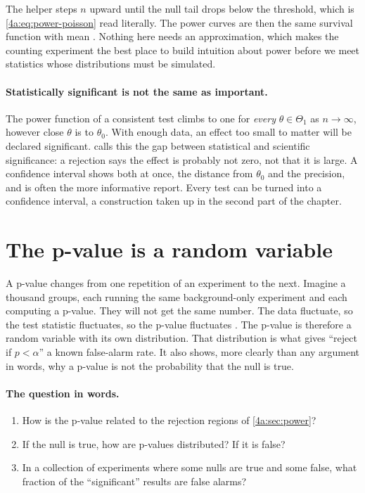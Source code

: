 
The helper  steps $n$ upward until the null tail
 drops below the threshold, which is
\eqref{4a:eq:power-poisson} read literally. The power curves are then the same
survival function with mean . Nothing here needs an
approximation, which makes the counting experiment the best place to build
intuition about power before we meet statistics whose distributions must be
simulated.

\paragraph{Statistically significant is not the same as important.}
The power function of a consistent test climbs to one for \emph{every}
$\theta\in\Theta_1$ as $n\to\infty$, however close $\theta$ is to $\theta_0$.
With enough data, an effect too small to matter will be declared significant.
 calls this the gap between statistical and scientific
significance: a rejection says the effect is probably not zero, not that it is
large. A confidence interval shows both at once, the distance from $\theta_0$
and the precision, and is often the more informative report. Every test can
be turned into a confidence interval, a construction taken up in the second
part of the chapter.
\section{The p-value is a random variable}
\label{4a:sec:uniform}

A p-value changes from one repetition of an experiment to the next. Imagine a
thousand groups, each running the same background-only experiment and each
computing a p-value. They will not get the same number. The data fluctuate, so
the test statistic fluctuates, so the p-value fluctuates
. The p-value is therefore a random variable with its own
distribution. That distribution is what gives ``reject if $p<\alpha$'' a known
false-alarm rate. It also shows, more clearly than any argument in words, why
a p-value is not the probability that the null is true.

\paragraph{The question in words.}
\begin{enumerate}[label=\arabic*.]
  \item How is the p-value related to the rejection regions of
        \cref{4a:sec:power}?
  \item If the null is true, how are p-values distributed? If it is false?
  \item In a collection of experiments where some nulls are true and some
        false, what fraction of the ``significant'' results are false alarms?
\end{enumerate}

